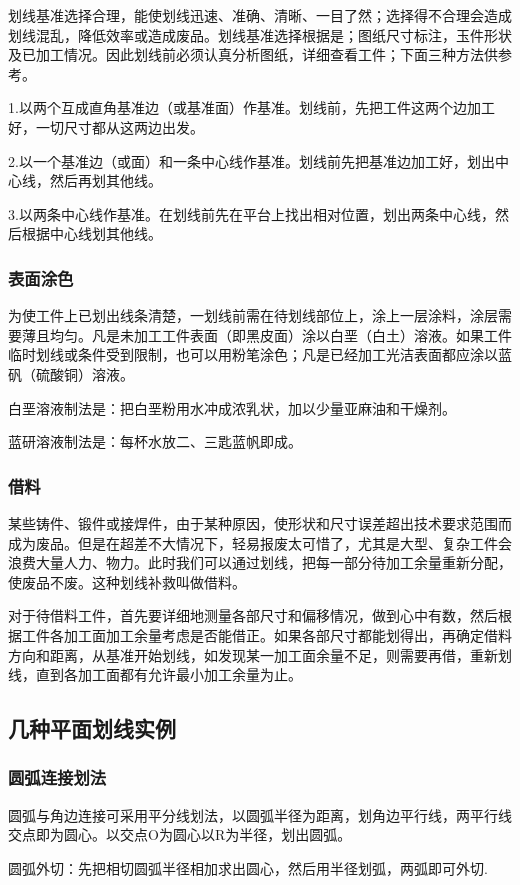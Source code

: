 \documentclass{ctexbook}
\begin{document}
划线基准选择合理，能使划线迅速、准确、清晰、一目了然；选择得不合理会造成划线混乱，降低效率或造成废品。划线基准选择根据是；图纸尺寸标注，玉件形状及已加工情况。因此划线前必须认真分析图纸，详细查看工件；下面三种方法供参考。

1.以两个互成直角基准边（或基准面）作基准。划线前，先把工件这两个边加工好，一切尺寸都从这两边出发。

2.以一个基准边（或面）和一条中心线作基准。划线前先把基准边加工好，划出中心线，然后再划其他线。

3.以两条中心线作基准。在划线前先在平台上找出相对位置，划出两条中心线，然后根据中心线划其他线。
\subsubsection{表面涂色}
为使工件上已划出线条清楚，一划线前需在待划线部位上，涂上一层涂料，涂层需要薄且均匀。凡是未加工工件表面（即黑皮面）涂以白垩（白土）溶液。如果工件临时划线或条件受到限制，也可以用粉笔涂色；凡是已经加工光洁表面都应涂以蓝矾（硫酸铜）溶液。

白垩溶液制法是：把白垩粉用水冲成浓乳状，加以少量亚麻油和干燥剂。

蓝研溶液制法是：每杯水放二、三匙蓝帆即成。
\subsubsection{借料}
某些铸件、锻件或接焊件，由于某种原因，使形状和尺寸误差超出技术要求范围而成为废品。但是在超差不大情况下，轻易报废太可惜了，尤其是大型、复杂工件会浪费大量人力、物力。此时我们可以通过划线，把每一部分待加工余量重新分配，使废品不废。这种划线补救叫做借料。

对于待借料工件，首先要详细地测量各部尺寸和偏移情况，做到心中有数，然后根据工件各加工面加工余量考虑是否能借正。如果各部尺寸都能划得出，再确定借料方向和距离，从基准开始划线，如发现某一加工面余量不足，则需要再借，重新划线，直到各加工面都有允许最小加工余量为止。
\subsection{几种平面划线实例}
\subsubsection{圆弧连接划法}
圆弧与角边连接可采用平分线划法，以圆弧半径为距离，划角边平行线，两平行线交点即为圆心。以交点O为圆心以R为半径，划出圆弧。

圆弧外切：先把相切圆弧半径相加求出圆心，然后用半径划弧，两弧即可外切.
\end{document}
